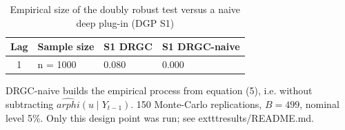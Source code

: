 \begin{table}[htbp]
\centering
\caption{Empirical size of the doubly robust test versus a naive deep plug-in (DGP S1)}
\label{tab:naive}
\small
\begin{tabular}{clll}
\toprule
Lag & Sample size & S1 DRGC & S1 DRGC-naive \\
\midrule
1 & n = 1000 & 0.080 & 0.000 \\
\bottomrule
\end{tabular}

\begin{minipage}{\linewidth}\footnotesize
DRGC-naive builds the empirical process from equation (5), i.e. without subtracting $\hat{arphi}(
u\mid Y_{t-1})$.  150 Monte-Carlo replications, $B=499$, nominal level 5\%.  Only this design point was run; see 	exttt{results/README.md}.
\end{minipage}
\end{table}
